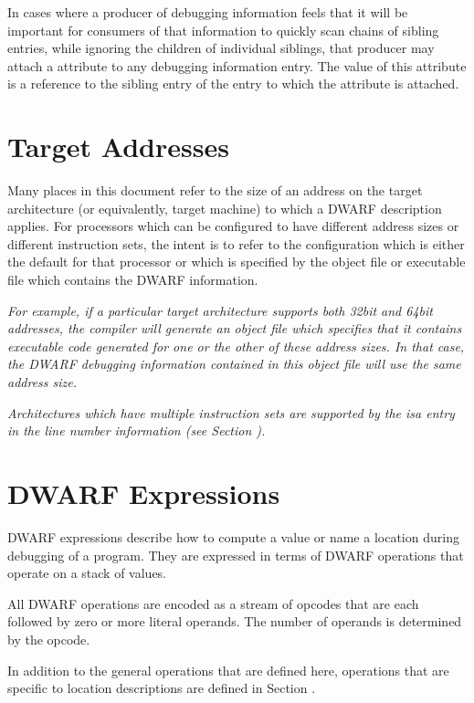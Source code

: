 In cases where a producer of debugging information feels that
it will be important for consumers of that information to
quickly scan chains of sibling entries, while ignoring the
children of individual siblings, that producer may attach a
 attribute to any debugging information entry. 
The
value of this attribute is a reference to the sibling entry
of the entry to which the attribute is attached.


\section{Target Addresses}
\label{chap:targetaddresses}
Many places in this document refer to the size of an address
on the target architecture (or equivalently, target machine)
to which a DWARF description applies. For processors which
can be configured to have different address sizes or different
instruction sets, the intent is to refer to the configuration
which is either the default for that processor or which is
specified by the object file or executable file which contains
the DWARF information.



\textit{
For example, if a particular target architecture supports
both 32\dash bit and 64\dash bit addresses, the compiler will generate
an object file which specifies that it contains executable
code generated for one or the other of these address sizes. In
that case, the DWARF debugging information contained in this
object file will use the same address size.
}

\textit{
Architectures which have multiple instruction sets are
supported by the isa entry in the line number information
(see Section ).
}


\section{DWARF Expressions}
\label{chap:dwarfexpressions}
DWARF expressions describe how to compute a value or name a
location during debugging of a program. 
They are expressed in
terms of DWARF operations that operate on a stack of values.

All DWARF operations are encoded as a stream of opcodes that
are each followed by zero or more literal operands. 
The number
of operands is determined by the opcode.  

In addition to the
general operations that are defined here, operations that are
specific to location descriptions are defined in 
Section  .

